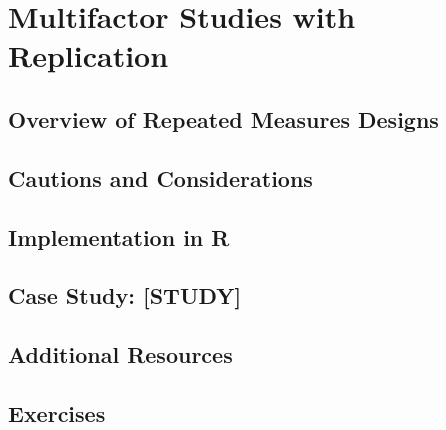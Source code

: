 
\chapter{Multifactor Studies with Replication}

\section{Overview of Repeated Measures Designs}

\section{Cautions and Considerations}

\section{Implementation in R}

\section{Case Study: [STUDY]}

\section{Additional Resources}

\section{Exercises}
